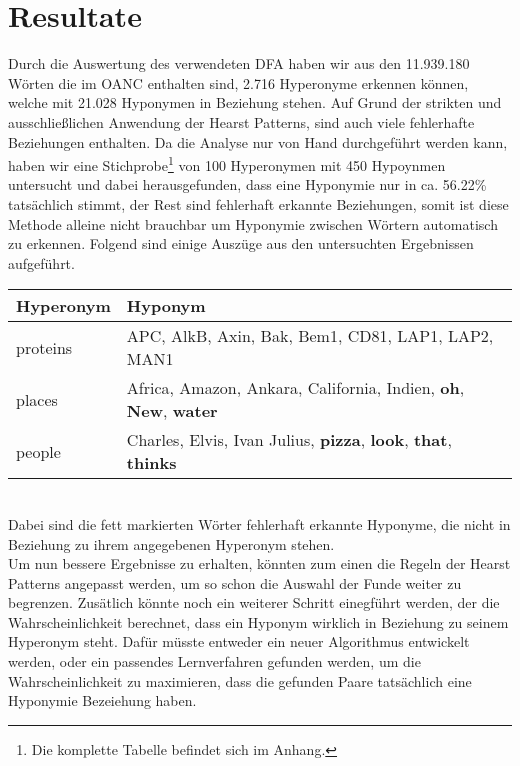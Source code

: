 \section{Resultate}%
%
Durch die Auswertung des verwendeten DFA haben wir aus den 11.939.180 Wörten
die im OANC enthalten sind, 2.716 Hyperonyme erkennen können, welche
mit 21.028 Hyponymen in Beziehung stehen. Auf Grund der strikten und ausschließlichen
Anwendung der Hearst Patterns, sind auch viele fehlerhafte
Beziehungen enthalten. Da die Analyse nur von Hand durchgeführt werden
kann, haben wir eine Stichprobe\footnote{Die komplette Tabelle
  befindet sich im Anhang.} von 100 Hyperonymen mit 450 Hypoynmen
untersucht und dabei herausgefunden, dass eine Hyponymie nur in ca.
56.22\% tatsächlich stimmt, der Rest sind fehlerhaft erkannte
Beziehungen, somit ist diese Methode alleine nicht brauchbar um
Hyponymie zwischen Wörtern automatisch zu erkennen. Folgend sind einige
Auszüge aus den untersuchten Ergebnissen aufgeführt.%
%
\begin{longtable}{|l|l|}
  \hline
  \textbf{Hyperonym} & \textbf{Hyponym} \\
  \hline
  proteins & APC, AlkB, Axin, Bak, Bem1, CD81, LAP1,
  LAP2, MAN1 \\
  \hline
  places & Africa, Amazon, Ankara, California, Indien, \textbf{oh},
  \textbf{New}, \textbf{water} \\
  \hline
  people & Charles, Elvis, Ivan Julius,
  \textbf{pizza}, \textbf{look}, \textbf{that}, \textbf{thinks} \\
  \hline
\end{longtable}%
~\\%
Dabei sind die fett markierten Wörter fehlerhaft erkannte Hyponyme,
die nicht in Beziehung zu ihrem angegebenen Hyperonym stehen.%
\\%
Um nun bessere Ergebnisse zu erhalten, könnten zum einen die Regeln
der Hearst Patterns angepasst werden, um so schon die Auswahl der
Funde weiter zu begrenzen. Zusätlich könnte noch ein weiterer
Schritt einegführt werden, der die Wahrscheinlichkeit berechnet, dass
ein Hyponym wirklich in Beziehung zu seinem Hyperonym steht. Dafür
müsste entweder ein neuer Algorithmus entwickelt werden, oder ein
passendes Lernverfahren gefunden werden, um die Wahrscheinlichkeit zu
maximieren, dass die gefunden Paare tatsächlich eine Hyponymie
Bezeiehung haben.
